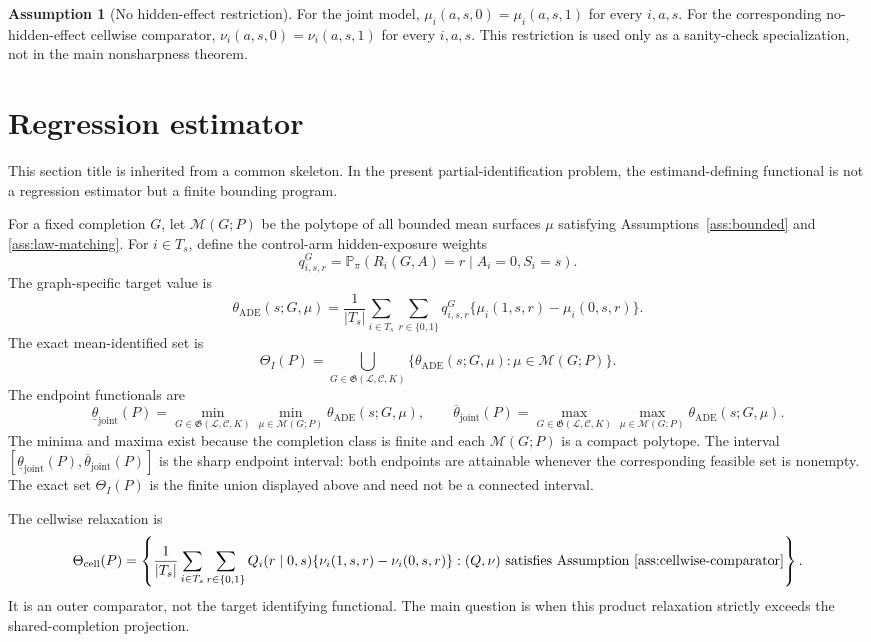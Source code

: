\documentclass[11pt]{article}
\renewcommand{\Pr}{\mathbb{P}}
\theoremstyle{definition}
\newtheorem{assumption}{Assumption}
\theoremstyle{plain}
\theoremstyle{remark}
\begin{document}
\begin{assumption}[No hidden-effect restriction]\label{ass:no-hidden-effect}
For the joint model, \(\mu_i(a,s,0)=\mu_i(a,s,1)\) for every \(i,a,s\).  For the
corresponding no-hidden-effect cellwise comparator,
\(\nu_i(a,s,0)=\nu_i(a,s,1)\) for every \(i,a,s\).  This restriction is used
only as a sanity-check specialization, not in the main nonsharpness theorem.
\end{assumption}

\section{Regression estimator}
This section title is inherited from a common skeleton.  In the present
partial-identification problem, the estimand-defining functional is not a
regression estimator but a finite bounding program.

For a fixed completion \(G\), let \(\mathcal M(G;P)\) be the polytope of all
bounded mean surfaces \(\mu\) satisfying Assumptions~\ref{ass:bounded} and
\ref{ass:law-matching}.  For \(i\in T_s\), define the control-arm hidden-exposure
weights
\[
q^G_{i,s,r}=\Pr_\pi(R_i(G,A)=r\mid A_i=0,S_i=s).
\]
The graph-specific target value is
\[
\theta_{\mathrm{ADE}}(s;G,\mu)
=\frac{1}{|T_s|}
\sum_{i\in T_s}\sum_{r\in\{0,1\}}
q^G_{i,s,r}\{\mu_i(1,s,r)-\mu_i(0,s,r)\}.
\]
The exact mean-identified set is
\[
\Theta_I(P)=
\bigcup_{G\in\mathfrak G(\mathcal L,\mathcal C,K)}
\{\theta_{\mathrm{ADE}}(s;G,\mu):\mu\in\mathcal M(G;P)\}.
\]
The endpoint functionals are
\[
\underline\theta_{\mathrm{joint}}(P)
=\min_{G\in\mathfrak G(\mathcal L,\mathcal C,K)}
\min_{\mu\in\mathcal M(G;P)}\theta_{\mathrm{ADE}}(s;G,\mu),
\qquad
\overline\theta_{\mathrm{joint}}(P)
=\max_{G\in\mathfrak G(\mathcal L,\mathcal C,K)}
\max_{\mu\in\mathcal M(G;P)}\theta_{\mathrm{ADE}}(s;G,\mu).
\]
The minima and maxima exist because the completion class is finite and each
\(\mathcal M(G;P)\) is a compact polytope.  The interval
\([\underline\theta_{\mathrm{joint}}(P),\overline\theta_{\mathrm{joint}}(P)]\)
is the sharp endpoint interval: both endpoints are attainable whenever the
corresponding feasible set is nonempty.  The exact set \(\Theta_I(P)\) is the
finite union displayed above and need not be a connected interval.

The cellwise relaxation is
\[
\Theta_{\mathrm{cell}}(P)=
\left\{
\frac{1}{|T_s|}\sum_{i\in T_s}\sum_{r\in\{0,1\}}
Q_i(r\mid0,s)\{\nu_i(1,s,r)-\nu_i(0,s,r)\}:
(Q,\nu)\text{ satisfies Assumption~\ref{ass:cellwise-comparator}}
\right\}.
\]
It is an outer comparator, not the target identifying functional.  The main
question is when this product relaxation strictly exceeds the shared-completion
projection.
\end{document}
